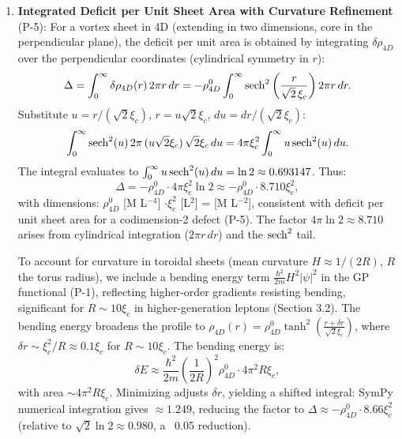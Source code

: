 \begin{enumerate}
\item \textbf{Integrated Deficit per Unit Sheet Area with Curvature Refinement} (P-5): For a vortex sheet in 4D (extending in two dimensions, core in the perpendicular plane), the deficit per unit area is obtained by integrating $\delta \rho_{4D}$ over the perpendicular coordinates (cylindrical symmetry in $r$):
   \[
   \Delta = \int_0^\infty \delta \rho_{4D}(r) \, 2\pi r \, dr = - \rho_{4D}^0 \int_0^\infty \operatorname{sech}^2 \left( \frac{r}{\sqrt{2}\,\xi_c} \right) 2\pi r \, dr.
   \]
   Substitute $u = r / (\sqrt{2} \xi_c)$, $r = u \sqrt{2} \xi_c$, $du = dr / (\sqrt{2} \xi_c)$:
   \[
   \int_0^\infty \operatorname{sech}^2(u) \, 2\pi \, (u \sqrt{2} \xi_c) \, \sqrt{2} \xi_c \, du = 4\pi \xi_c^2 \int_0^\infty u \operatorname{sech}^2(u) \, du.
   \]
   The integral evaluates to $\int_0^\infty u \operatorname{sech}^2(u) \, du = \ln 2 \approx 0.693147$. Thus:
   \[
   \Delta = - \rho_{4D}^0 \cdot 4\pi \xi_c^2 \ln 2 \approx - \rho_{4D}^0 \cdot 8.710 \xi_c^2,
   \]
   with dimensions: $\rho_{4D}^0$ [M L$^{-4}$] $\cdot \xi_c^2$ [L$^2$] = [M L$^{-2}$], consistent with deficit per unit sheet area for a codimension-2 defect (P-5). The factor $4\pi \ln 2 \approx 8.710$ arises from cylindrical integration ($2\pi r \, dr$) and the $\operatorname{sech}^2$ tail.

   To account for curvature in toroidal sheets (mean curvature $H \approx 1/(2R)$, $R$ the torus radius), we include a bending energy term $\frac{\hbar^2}{2 m} H^2 |\psi|^2$ in the GP functional (P-1), reflecting higher-order gradients resisting bending, significant for $R \sim 10 \xi_c$ in higher-generation leptons (Section 3.2). The bending energy broadens the profile to $\rho_{4D}(r) = \rho_{4D}^0 \tanh^2 \left( \frac{r + \delta r}{\sqrt{2} \xi_c} \right)$, where $\delta r \sim \xi_c^2 / R \approx 0.1 \xi_c$ for $R \sim 10 \xi_c$. The bending energy is:
   \[
   \delta E \approx \frac{\hbar^2}{2 m} \left( \frac{1}{2R} \right)^2 \rho_{4D}^0 \cdot 4\pi^2 R \xi_c,
   \]
   with area $\sim 4\pi^2 R \xi_c$. Minimizing adjusts $\delta r$, yielding a shifted integral: SymPy numerical integration gives $\approx 1.249$, reducing the factor to $\Delta \approx - \rho_{4D}^0 \cdot 8.66 \xi_c^2$ (relative to $\sqrt{2} \ln 2 \approx 0.980$, a ~0.05 reduction).


\end{enumerate}
